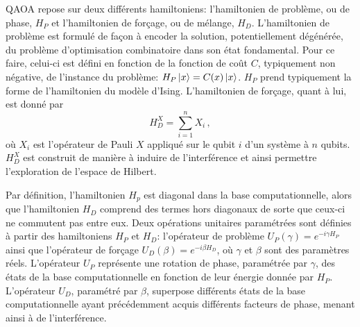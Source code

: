 QAOA repose sur deux différents hamiltoniens: l'hamiltonien de problème, ou de phase, $H_{P}$ et l'hamiltonien de forçage, ou de mélange, $H_{D}$. L'hamiltonien de problème est formulé de façon à encoder la solution, potentiellement dégénérée, du problème d'optimisation combinatoire dans son état fondamental. Pour ce faire, celui-ci est défini en fonction de la fonction de coût $C$, typiquement non négative, de l'instance du problème: $H_{P}\ket{x} = C(x)\ket{x}$. $H_{P}$ prend typiquement la forme de l'hamiltonien du modèle d'Ising. L'hamiltonien de forçage, quant à lui, est donné par
\begin{equation}
    \label{eq:x-drive}
    H_{D}^{X} = \sum_{i=1}^{n} X_{i} \,,
\end{equation}
où $X_{i}$ est l'opérateur de Pauli $X$ appliqué sur le qubit $i$ d'un système à $n$ qubits. $H_{D}^{X}$ est construit de manière à induire de l'interférence et ainsi permettre l'exploration de l'espace de Hilbert. 

Par définition, l'hamiltonien $H_{p}$ est diagonal dans la base computationnelle, alors que l'hamiltonien $H_{D}$ comprend des termes hors diagonaux de sorte que ceux-ci ne commutent pas entre eux. Deux opérations unitaires paramétrées sont définies à partir des hamiltoniens $H_{P}$ et $H_{D}$: l'opérateur de problème $U_{P}(\gamma) = e^{-i \gamma H_{P}}$ ainsi que l'opérateur de forçage $U_{D}(\beta) = e^{-i \beta H_{D}}$, où $\gamma$ et $\beta$ sont des paramètres réels. L'opérateur $U_{P}$ représente une rotation de phase, paramétrée par $\gamma$, des états de la base computationnelle en fonction de leur énergie donnée par $H_{P}$. L'opérateur $U_{D}$, paramétré par $\beta$, superpose différents états de la base computationnelle ayant précédemment acquis différents facteurs de phase, menant ainsi à de l'interférence.

